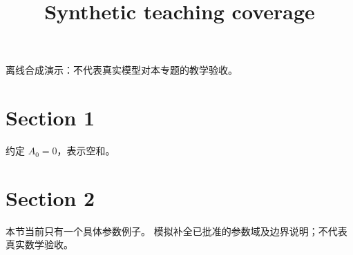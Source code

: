 \documentclass[UTF8,fontset=fandol,11pt]{ctexart}
\title{Synthetic teaching coverage}
\date{}
\begin{document}
\maketitle
\par\noindent 离线合成演示：不代表真实模型对本专题的教学验收。\par
\section{Section 1}\label{sec:S01}
约定 $A_0=0$，表示空和。\par
\section{Section 2}\label{sec:S02}
本节当前只有一个具体参数例子。 模拟补全已批准的参数域及边界说明；不代表真实数学验收。\par
\end{document}

